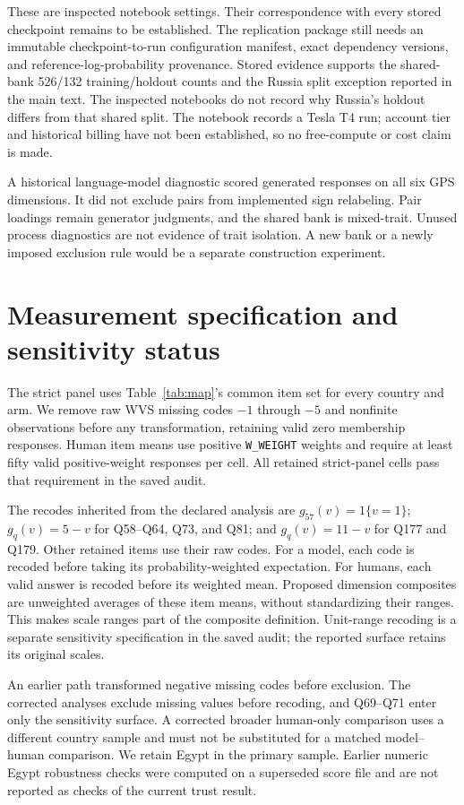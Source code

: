 These are inspected notebook settings. Their correspondence with every stored checkpoint remains to be established. The replication package still needs an immutable checkpoint-to-run configuration manifest, exact dependency versions, and reference-log-probability provenance. Stored evidence supports the shared-bank 526/132 training/holdout counts and the Russia split exception reported in the main text. The inspected notebooks do not record why Russia's holdout differs from that shared split. The notebook records a Tesla T4 run; account tier and historical billing have not been established, so no free-compute or cost claim is made.

A historical language-model diagnostic scored generated responses on all six GPS dimensions. It did not exclude pairs from implemented sign relabeling. Pair loadings remain generator judgments, and the shared bank is mixed-trait. Unused process diagnostics are not evidence of trait isolation. A new bank or a newly imposed exclusion rule would be a separate construction experiment.

\section{Measurement specification and sensitivity status}\label{app:measurement}
The strict panel uses Table~\ref{tab:map}'s common item set for every country and arm. We remove raw WVS missing codes $-1$ through $-5$ and nonfinite observations before any transformation, retaining valid zero membership responses. Human item means use positive \texttt{W\_WEIGHT} weights and require at least fifty valid positive-weight responses per cell. All retained strict-panel cells pass that requirement in the saved audit.

The recodes inherited from the declared analysis are $g_{57}(v)=1\{v=1\}$; $g_q(v)=5-v$ for Q58--Q64, Q73, and Q81; and $g_q(v)=11-v$ for Q177 and Q179. Other retained items use their raw codes. For a model, each code is recoded before taking its probability-weighted expectation. For humans, each valid answer is recoded before its weighted mean. Proposed dimension composites are unweighted averages of these item means, without standardizing their ranges. This makes scale ranges part of the composite definition. Unit-range recoding is a separate sensitivity specification in the saved audit; the reported surface retains its original scales.

An earlier path transformed negative missing codes before exclusion. The corrected analyses exclude missing values before recoding, and Q69--Q71 enter only the sensitivity surface. A corrected broader human-only comparison uses a different country sample and must not be substituted for a matched model--human comparison. We retain Egypt in the primary sample. Earlier numeric Egypt robustness checks were computed on a superseded score file and are not reported as checks of the current trust result.


